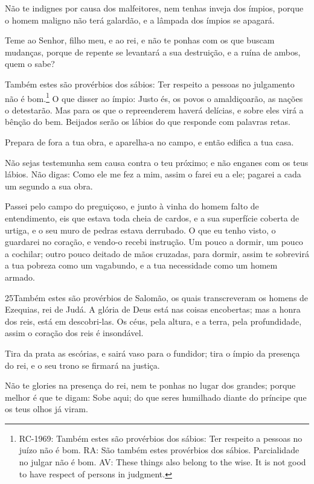 Não te indignes por causa dos malfeitores, nem tenhas inveja dos
ímpios, porque o homem maligno não terá galardão, e a lâmpada
dos ímpios se apagará.

Teme ao Senhor, filho meu, e ao rei, e não te ponhas com os que
buscam mudanças, porque de repente se levantará a sua
destruição, e a ruína de ambos, quem o sabe?

Também estes são provérbios dos sábios: Ter respeito a pessoas no
julgamento não é bom.\footnote{RC-1969: Também estes são provérbios
dos sábios: Ter respeito a pessoas no juízo não é bom. RA: São
também estes provérbios dos sábios. Parcialidade no julgar não é
bom. AV: These things also belong to the wise. It is not good to
have respect of persons in judgment.} O que disser ao ímpio:
Justo és, os povos o amaldiçoarão, as nações o detestarão.
Mas para os que o repreenderem haverá delícias, e sobre eles
virá a bênção do bem. Beijados serão os lábios do que
responde com palavras retas.

Prepara de fora a tua obra, e aparelha-a no campo, e então
edifica a tua casa.

Não sejas testemunha sem causa contra o teu próximo; e não
enganes com os teus lábios. Não digas: Como ele me fez a mim,
assim o farei eu a ele; pagarei a cada um segundo a sua obra.

Passei pelo campo do preguiçoso, e junto à vinha do homem falto
de entendimento, eis que estava toda cheia de cardos, e a sua
superfície coberta de urtiga, e o seu muro de pedras estava
derrubado. O que eu tenho visto, o guardarei no coração, e
vendo-o recebi instrução. Um pouco a dormir, um pouco a
cochilar; outro pouco deitado de mãos cruzadas, para dormir,
assim te sobrevirá a tua pobreza como um vagabundo, e a tua
necessidade como um homem armado.

\medskip

\lettrine{25}{}Também estes são provérbios de Salomão, os quais
transcreveram os homens de Ezequias, rei de Judá.  A
glória de Deus está nas coisas encobertas; mas a honra dos reis,
está em descobri-las. Os céus, pela altura, e a terra, pela
profundidade, assim o coração dos reis é insondável.

Tira da prata as escórias, e sairá vaso para o fundidor; tira
o ímpio da presença do rei, e o seu trono se firmará na justiça.

Não te glories na presença do rei, nem te ponhas no lugar dos
grandes; porque melhor é que te digam: Sobe aqui; do que seres
humilhado diante do príncipe que os teus olhos já viram.

